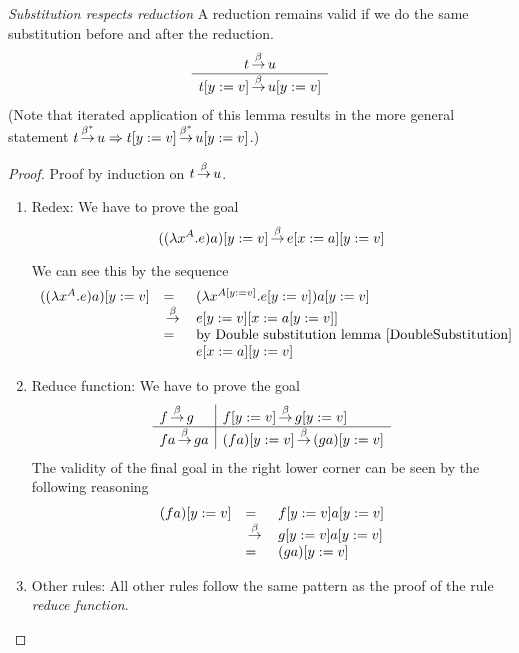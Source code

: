\begin{theorem}
    \label{SubstituteReduction}
    \emph{Substitution respects reduction} A reduction remains valid if we do
    the same substitution before and after the reduction.
    $$
    \begin{array}{c} 
        t {\,\stackrel{\beta}{\to}\,} u
     \\ \hline 
        t[y:=v] {\,\stackrel{\beta}{\to}\,} u[y:=v]
    \end{array}
    $$
    (Note that iterated application of this lemma results in the more general
    statement $t {\,\stackrel{\beta^*}{\to}\,} u \Rightarrow t[y:=v] {\,\stackrel{\beta^*}{\to}\,} u[y:=v]$.)

    \begin{proof}
        Proof by induction on $t {\,\stackrel{\beta}{\to}\,} u$.


        \begin{enumerate}

        \item Redex: We have to prove the goal
            $$
                ((\lambda x^A. e) a)[y:=v] {\,\stackrel{\beta}{\to}\,} e[x:=a][y:=v]
            $$

            We can see this by the sequence
            $$
            \begin{array}{lll}
                ((\lambda x^A. e) a)[y:=v]
                &=&
                (\lambda x^{A[y:=v]}. e[y:=v]) a[y:=v]
                \\
                &{\,\stackrel{\beta}{\to}\,}&
                e[y:=v][x:=a[y:=v]]
                \\
                &=& \text{by Double substitution lemma~\ref{DoubleSubstitution}}
                \\
                &&e[x:=a][y:=v]
            \end{array}
            $$

        \item Reduce function: We have to prove the goal
            $$
            \begin{array}{l|l}
                f {\,\stackrel{\beta}{\to}\,} g
                & f[y:=v] {\,\stackrel{\beta}{\to}\,} g[y:=v]
                \\
                \hline
                f a {\,\stackrel{\beta}{\to}\,} g a
                &(f a)[y:=v] {\,\stackrel{\beta}{\to}\,} (g a)[y:=v]
            \end{array}
            $$
            The validity of the final goal in the right lower corner can be seen
            by the following reasoning
            $$
            \begin{array}{lll}
                (f a)[y:=v]
                &=&
                f[y:=v] a[y:=v]
                \\
                &{\,\stackrel{\beta}{\to}\,}&
                g[y:=v] a[y:=v]
                \\
                &=&
                (g a)[y:=v]
            \end{array}
            $$

        \item Other rules: All other rules follow the same pattern as the proof
            of the rule \emph{reduce function}.
        \end{enumerate}
    \end{proof}
\end{theorem}





